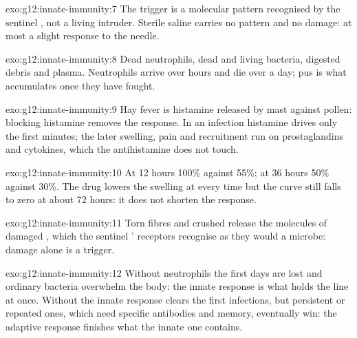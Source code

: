 \begin{solution}{exo:g12:innate-immunity:7}
The trigger is a molecular pattern recognised by the sentinel ,
not a living intruder. Sterile saline carries no pattern and no
damage: at most a slight response to the needle.
\end{solution}

\begin{solution}{exo:g12:innate-immunity:8}
Dead neutrophils, dead and living bacteria, digested debris and
plasma. Neutrophils arrive over hours and die over a day; pus is what
accumulates once they have fought.
\end{solution}

\begin{solution}{exo:g12:innate-immunity:9}
Hay fever is histamine released by mast  against pollen: blocking
histamine removes the response. In an infection histamine drives only
the first minutes; the later swelling, pain and recruitment run on
prostaglandins and cytokines, which the antihistamine does not touch.
\end{solution}

\begin{solution}{exo:g12:innate-immunity:10}
At 12 hours 100\% against 55\%; at 36 hours 50\% against 30\%. The
drug lowers the swelling at every time but the curve still falls to
zero at about 72 hours: it does not shorten the response.
\end{solution}

\begin{solution}{exo:g12:innate-immunity:11}
Torn  fibres and crushed  release the molecules of
damaged , which the sentinel ' receptors recognise as they
would a microbe: damage alone is a trigger.
\end{solution}

\begin{solution}{exo:g12:innate-immunity:12}
Without neutrophils the first days are lost and ordinary bacteria
overwhelm the body: the innate response is what holds the line at
once. Without  the innate response clears the first
infections, but persistent or repeated ones, which need specific
antibodies and memory, eventually win: the adaptive response finishes
what the innate one contains.
\end{solution}

